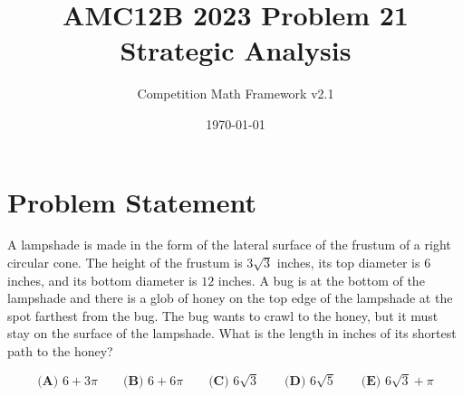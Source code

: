 \documentclass[12pt]{article}
\begin{document}
\title{AMC12B 2023 Problem 21\\Strategic Analysis}
\author{Competition Math Framework v2.1}
\date{\today}
\maketitle

\section*{Problem Statement}

A lampshade is made in the form of the lateral surface of the frustum of a right circular cone. The height of the frustum is $3\sqrt{3}$ inches, its top diameter is $6$ inches, and its bottom diameter is $12$ inches. A bug is at the bottom of the lampshade and there is a glob of honey on the top edge of the lampshade at the spot farthest from the bug. The bug wants to crawl to the honey, but it must stay on the surface of the lampshade. What is the length in inches of its shortest path to the honey?

$$\textbf{(A) } 6 + 3\pi\qquad \textbf{(B) }6 + 6\pi\qquad \textbf{(C) } 6\sqrt{3} \qquad \textbf{(D) } 6\sqrt{5} \qquad \textbf{(E) } 6\sqrt{3} + \pi$$
\end{document}
